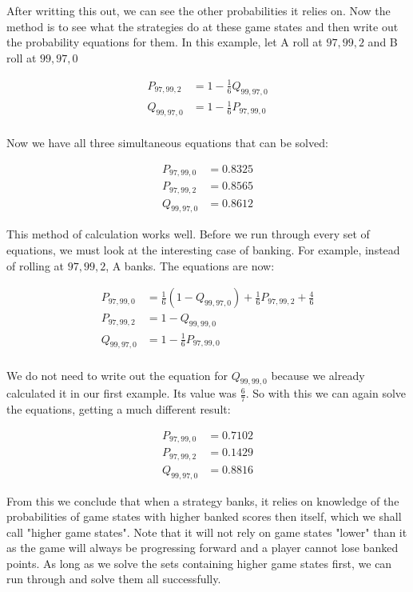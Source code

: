 \documentclass[a4paper,titlepage]{article}
\begin{document}
After writting this out, we can see the other probabilities it relies on. Now the method is to see what the strategies do at these game states and then write out the probability equations for them. In this example, let A roll at $97,99,2$ and B roll at $99,97,0$

\begin{align*}
	P_{97,99,2} &= 1 - \frac{1}{6}Q_{99,97,0}\\
	Q_{99,97,0} &= 1 - \frac{1}{6}P_{97,99,0}\\
\end{align*}

Now we have all three simultaneous equations that can be solved:

\begin{align*}
	P_{97,99,0} &= 0.8325\\
	P_{97,99,2} &= 0.8565\\
	Q_{99,97,0} &= 0.8612
\end{align*}

This method of calculation works well. Before we run through every set of equations, we must look at the interesting case of banking. For example, instead of rolling at $97,99,2$, A banks. The equations are now:

\begin{align*}
	P_{97,99,0} &= \frac{1}{6}(1 - Q_{99,97,0})+\frac{1}{6}P_{97,99,2}+\frac{4}{6}\\
	P_{97,99,2} &= 1 - Q_{99,99,0}\\
	Q_{99,97,0} &= 1 - \frac{1}{6}P_{97,99,0}\\
\end{align*}

We do not need to write out the equation for $Q_{99,99,0}$ because we already calculated it in our first example. Its value was $\frac{6}{7}$. So with this we can again solve the equations, getting a much different result:

\begin{align*}
	P_{97,99,0} &= 0.7102\\
	P_{97,99,2} &= 0.1429\\
	Q_{99,97,0} &= 0.8816
\end{align*}

From this we conclude that when a strategy banks, it relies on knowledge of the probabilities of game states with higher banked scores then itself, which we shall call "higher game states". Note that it will not rely on game states "lower" than it as the game will always be progressing forward and a player cannot lose banked points. As long as we solve the sets containing higher game states first, we can run through and solve them all successfully.
\end{document}
